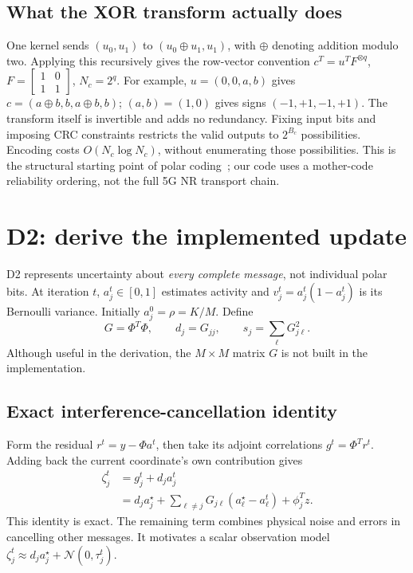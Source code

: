 \documentclass[10pt,a4paper]{article}
\begin{document}
\subsection{What the XOR transform actually does}
One kernel sends $(u_0,u_1)$ to $(u_0\oplus u_1,u_1)$, with $\oplus$ denoting addition modulo two.
Applying this recursively gives the row-vector convention $c^T=u^T F^{\otimes q}$,
$F=\left[\begin{smallmatrix}1&0\\1&1\end{smallmatrix}\right]$, $N_c=2^q$.
For example, $u=(0,0,a,b)$ gives $c=(a\oplus b,b,a\oplus b,b)$; $(a,b)=(1,0)$ gives signs $(-1,+1,-1,+1)$.
The transform itself is invertible and adds no redundancy. Fixing input bits and imposing CRC constraints restricts
the valid outputs to $2^{B_c}$ possibilities. Encoding costs $O(N_c\log N_c)$, without enumerating those possibilities.
This is the structural starting point of polar coding~\cite{arikan}; our code uses a mother-code reliability ordering,
not the full 5G NR transport chain.

\clearpage
\section{D2: derive the implemented update}
D2 represents uncertainty about \emph{every complete message}, not individual polar bits.
At iteration $t$, $a_j^t\in[0,1]$ estimates activity and $v_j^t=a_j^t(1-a_j^t)$ is its Bernoulli variance.
Initially $a_j^0=\rho=K/M$. Define
\begin{equation}
 G=\Phi^T\Phi,\qquad d_j=G_{jj},\qquad s_j=\sum_\ell G_{j\ell}^2.
\end{equation}
Although useful in the derivation, the $M\times M$ matrix $G$ is not built in the implementation.

\subsection{Exact interference-cancellation identity}
Form the residual $r^t=y-\Phi a^t$, then take its adjoint correlations $g^t=\Phi^T r^t$.
Adding back the current coordinate's own contribution gives
\begin{align}
 \zeta_j^t&=g_j^t+d_j a_j^t\\
 &=d_j a_j^\star+\sum_{\ell\ne j}G_{j\ell}(a_\ell^\star-a_\ell^t)+\phi_j^T z.
 \label{eq:exactd2}
\end{align}
This identity is exact. The remaining term combines physical noise and errors in cancelling other messages.
It motivates a scalar observation model $\zeta_j^t\approx d_j a_j^\star+\mathcal N(0,\tau_j^t)$.
\end{document}
